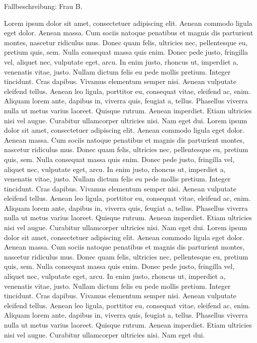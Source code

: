 \documentclass[DIV=13]{scrartcl}
\newenvironment{fall}[1]{
	\definecolor{TFFrameColor}{rgb}{0.7,0.7,1}
	\definecolor{TFTitleColor}{rgb}{0,0,0}
	\begin{titled-frame}{Fallbeschreibung: #1}
}{
	\end{titled-frame}
}
\begin{document}
\begin{fall}{Frau B.}
Lorem ipsum dolor sit amet, consectetuer adipiscing elit. Aenean commodo ligula eget dolor. Aenean massa. Cum sociis natoque penatibus et magnis dis parturient montes, nascetur ridiculus mus. Donec quam felis, ultricies nec, pellentesque eu, pretium quis, sem. Nulla consequat massa quis enim. Donec pede justo, fringilla vel, aliquet nec, vulputate eget, arcu. In enim justo, rhoncus ut, imperdiet a, venenatis vitae, justo. Nullam dictum felis eu pede mollis pretium. Integer tincidunt. Cras dapibus. Vivamus elementum semper nisi. Aenean vulputate eleifend tellus. Aenean leo ligula, porttitor eu, consequat vitae, eleifend ac, enim. Aliquam lorem ante, dapibus in, viverra quis, feugiat a, tellus. Phasellus viverra nulla ut metus varius laoreet. Quisque rutrum. Aenean imperdiet. Etiam ultricies nisi vel augue. Curabitur ullamcorper ultricies nisi. Nam eget dui.
Lorem ipsum dolor sit amet, consectetuer adipiscing elit. Aenean commodo ligula eget dolor. Aenean massa. Cum sociis natoque penatibus et magnis dis parturient montes, nascetur ridiculus mus. Donec quam felis, ultricies nec, pellentesque eu, pretium quis, sem. Nulla consequat massa quis enim. Donec pede justo, fringilla vel, aliquet nec, vulputate eget, arcu. In enim justo, rhoncus ut, imperdiet a, venenatis vitae, justo. Nullam dictum felis eu pede mollis pretium. Integer tincidunt. Cras dapibus. Vivamus elementum semper nisi. Aenean vulputate eleifend tellus. Aenean leo ligula, porttitor eu, consequat vitae, eleifend ac, enim. Aliquam lorem ante, dapibus in, viverra quis, feugiat a, tellus. Phasellus viverra nulla ut metus varius laoreet. Quisque rutrum. Aenean imperdiet. Etiam ultricies nisi vel augue. Curabitur ullamcorper ultricies nisi. Nam eget dui.
Lorem ipsum dolor sit amet, consectetuer adipiscing elit. Aenean commodo ligula eget dolor. Aenean massa. Cum sociis natoque penatibus et magnis dis parturient montes, nascetur ridiculus mus. Donec quam felis, ultricies nec, pellentesque eu, pretium quis, sem. Nulla consequat massa quis enim. Donec pede justo, fringilla vel, aliquet nec, vulputate eget, arcu. In enim justo, rhoncus ut, imperdiet a, venenatis vitae, justo. Nullam dictum felis eu pede mollis pretium. Integer tincidunt. Cras dapibus. Vivamus elementum semper nisi. Aenean vulputate eleifend tellus. Aenean leo ligula, porttitor eu, consequat vitae, eleifend ac, enim. Aliquam lorem ante, dapibus in, viverra quis, feugiat a, tellus. Phasellus viverra nulla ut metus varius laoreet. Quisque rutrum. Aenean imperdiet. Etiam ultricies nisi vel augue. Curabitur ullamcorper ultricies nisi. Nam eget dui.
\end{fall}
\end{document}
